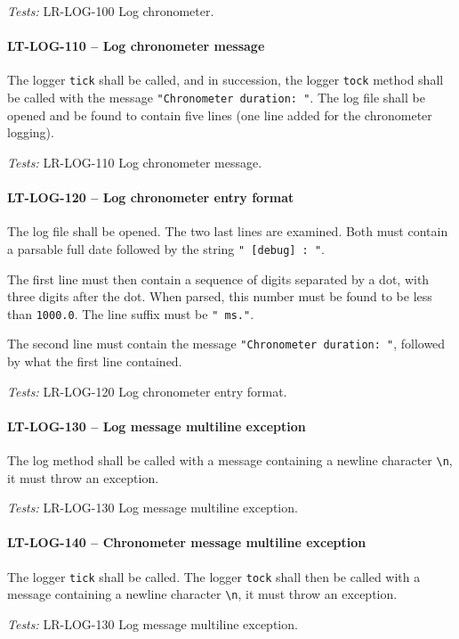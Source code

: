 \textit{Tests: } LR-LOG-100 Log chronometer.

\paragraph{LT-LOG-110 -- Log chronometer message}
The logger \lstinline{tick} shall be called,
and in succession, the logger \lstinline{tock} method shall
be called with the message \lstinline{"Chronometer duration: "}.
The log file shall be opened and be found to contain five lines
(one line added for the chronometer logging).

\textit{Tests: } LR-LOG-110 Log chronometer message.

\paragraph{LT-LOG-120 -- Log chronometer entry format}
The log file shall be opened. The two last lines are examined.
Both must contain a parsable full date followed by
the string \lstinline{" [debug] : "}.

The first line must then contain a sequence of digits separated
by a dot, with three digits after the dot. When parsed, this number
must be found to be less than \lstinline{1000.0}. The line suffix
must be \lstinline{" ms."}.

The second line must contain the message
\lstinline{"Chronometer duration: "}, followed by what the first line
contained.

\textit{Tests: } LR-LOG-120 Log chronometer entry format.

\paragraph{LT-LOG-130 -- Log message multiline exception}
The log method shall be called with a message containing
a newline character \lstinline{\n}, it must throw an exception.

\textit{Tests: } LR-LOG-130 Log message multiline exception.

\paragraph{LT-LOG-140 -- Chronometer message multiline exception}
The logger \lstinline{tick} shall be called.
The logger \lstinline{tock} shall then be called with a message
containing a newline character \lstinline{\n}, it must throw
an exception.

\textit{Tests: } LR-LOG-130 Log message multiline exception.
